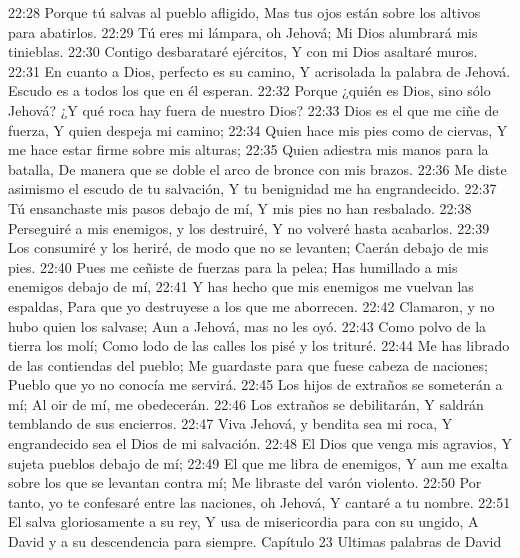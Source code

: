22:28 Porque tú salvas al pueblo afligido,  
Mas tus ojos están sobre los altivos para abatirlos. 
22:29 Tú eres mi lámpara, oh Jehová; 
Mi Dios alumbrará mis tinieblas.  
22:30 Contigo desbarataré ejércitos,  
Y con mi Dios asaltaré muros.  
22:31 En cuanto a Dios, perfecto es su camino,  
Y acrisolada la palabra de Jehová.  
Escudo es a todos los que en él esperan.  
22:32 Porque ¿quién es Dios, sino sólo Jehová?  
¿Y qué roca hay fuera de nuestro Dios?  
22:33 Dios es el que me ciñe de fuerza,  
Y quien despeja mi camino;  
22:34 Quien hace mis pies como de ciervas, 
Y me hace estar firme sobre mis alturas;  
22:35 Quien adiestra mis manos para la batalla,  
De manera que se doble el arco de bronce con mis brazos.  
22:36 Me diste asimismo el escudo de tu salvación,  
Y tu benignidad me ha engrandecido.  
22:37 Tú ensanchaste mis pasos debajo de mí,  
Y mis pies no han resbalado. 
22:38 Perseguiré a mis enemigos, y los destruiré,  
Y no volveré hasta acabarlos.  
22:39 Los consumiré y los heriré, de modo que no se levanten;  
Caerán debajo de mis pies.  
22:40 Pues me ceñiste de fuerzas para la pelea;  
Has humillado a mis enemigos debajo de mí,  
22:41 Y has hecho que mis enemigos me vuelvan las espaldas,  
Para que yo destruyese a los que me aborrecen.  
22:42 Clamaron, y no hubo quien los salvase;  
Aun a Jehová, mas no les oyó.  
22:43 Como polvo de la tierra los molí;  
Como lodo de las calles los pisé y los trituré.  
22:44 Me has librado de las contiendas del pueblo;  
Me guardaste para que fuese cabeza de naciones;  
Pueblo que yo no conocía me servirá.  
22:45 Los hijos de extraños se someterán a mí;  
Al oir de mí, me obedecerán.  
22:46 Los extraños se debilitarán,  
Y saldrán temblando de sus encierros.  
22:47 Viva Jehová, y bendita sea mi roca,  
Y engrandecido sea el Dios de mi salvación.  
22:48 El Dios que venga mis agravios,  
Y sujeta pueblos debajo de mí;  
22:49 El que me libra de enemigos,  
Y aun me exalta sobre los que se levantan contra mí;  
Me libraste del varón violento.  
22:50 Por tanto, yo te confesaré entre las naciones, oh Jehová,  
Y cantaré a tu nombre. 
22:51 El salva gloriosamente a su rey,  
Y usa de misericordia para con su ungido,  
A David y a su descendencia para siempre.  
Capítulo 23 
Ultimas palabras de David  

